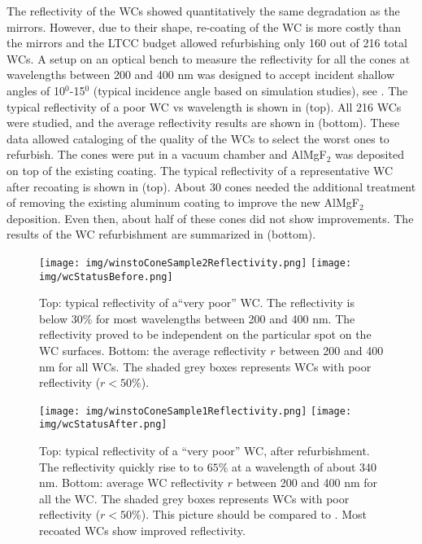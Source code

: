 The reflectivity of the WCs showed quantitatively the same degradation as the mirrors. However, due to their shape, re-coating of the WC is more costly
than the mirrors and the LTCC budget allowed refurbishing only 160 out of 216 total WCs.
A setup on an optical bench to measure the reflectivity for all the cones at wavelengths between 200 and 400 nm was designed to
accept incident shallow angles of 10$^0$-15$^0$ (typical incidence angle based on simulation studies), see .
The typical reflectivity of a poor WC vs wavelength is shown in  (top).
All 216 WCs were studied, and the average reflectivity results are shown in  (bottom).
These data allowed cataloging of the quality of the WCs to select the worst ones to refurbish.
The cones were put in a vacuum chamber and AlMgF$_2$ was deposited on top of the existing coating.
The typical reflectivity of a representative WC after recoating is shown in  (top).
About 30 cones needed the additional treatment of removing the existing aluminum coating to improve the new AlMgF$_2$ deposition.
Even then, about half of these cones did not show improvements.
The results of the WC refurbishment are summarized in  (bottom).


\begin{figure}
	\centering
	\texttt{[image: img/winstoConeSample2Reflectivity.png]}
	\texttt{[image: img/wcStatusBefore.png]}
	\caption{Top: typical reflectivity of a``very poor'' WC. The reflectivity is below 30\% for most wavelengths between 200 and 400 nm.
             The reflectivity proved to be independent on the particular spot on the WC surfaces.
             Bottom: the average reflectivity $r$ between 200 and 400 nm for all WCs. The shaded grey boxes represents WCs with poor reflectivity ($r < 50\%$).}
	\label{fig:wcStatusBefore}
\end{figure}


\begin{figure}
	\centering
	\texttt{[image: img/winstoConeSample1Reflectivity.png]}
	\texttt{[image: img/wcStatusAfter.png]}
	\caption{Top: typical reflectivity of a ``very poor'' WC, after refurbishment.
            The reflectivity quickly rise to to $65\%$ at a wavelength of about 340 nm. Bottom: average WC reflectivity $r$ between 200 and 400 nm for
			all the WC. The shaded grey boxes represents WCs with poor reflectivity ($r < 50\%$).
            This picture should be compared to . Most recoated WCs show improved reflectivity.}
	\label{fig:wcStatusAfter}
\end{figure}


